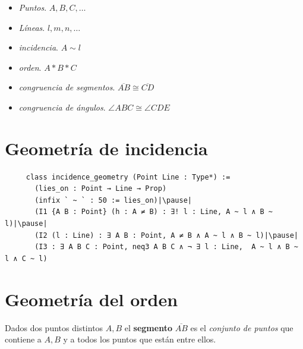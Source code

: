 \documentclass[t, aspectratio=169]{beamer}
\begin{document}
\begin{frame}[fragile, c]
	\begin{itemize}
		\item \textit{Puntos}. $A, B, C, \dots$
		\item \textit{Líneas}. $l, m, n, \dots$
		\item \textit{incidencia}. $A\sim l$
		\item \textit{orden}. $A * B * C$
		\item \textit{congruencia de segmentos}. $\overline{AB}\cong\overline{CD}$
		\item \textit{congruencia de ángulos}. $\angle ABC \cong\angle CDE$
	\end{itemize}
\end{frame}



\section{Geometría de incidencia}

% 

\begin{frame}[fragile]
	\begin{lstlisting}
     class incidence_geometry (Point Line : Type*) :=
       (lies_on : Point → Line → Prop)
       (infix ` ~ ` : 50 := lies_on)|\pause|
       (I1 {A B : Point} (h : A ≠ B) : ∃! l : Line, A ~ l ∧ B ~ l)|\pause|
       (I2 (l : Line) : ∃ A B : Point, A ≠ B ∧ A ~ l ∧ B ~ l)|\pause|
       (I3 : ∃ A B C : Point, neq3 A B C ∧ ¬ ∃ l : Line,  A ~ l ∧ B ~ l ∧ C ~ l)
    \end{lstlisting}
\end{frame}

% 


\section{Geometría del orden}

\begin{frame}[fragile]
	\begin{defin*}
		Dados dos puntos distintos $A, B$ el \textbf{segmento}
		$\overline{AB}$ es el \textit{conjunto de puntos} que contiene a $A, B$ y a todos los
		puntos que están entre ellos.
	\end{defin*}
\end{frame}
\end{document}
